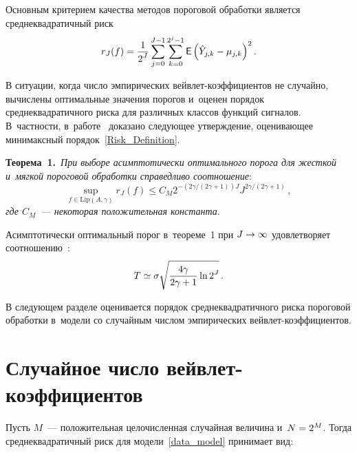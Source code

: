 \begin{multicols}{2}
Основным критерием качества методов пороговой обработки является 
среднеквадратичный риск
\begin{equation}\label{Risk_Definition}
r_J(f)=\displaystyle\frac{\displaystyle 1\mathstrut}{\displaystyle 2^J\mathstrut}\sum\limits_{j=0}^{J-1}\sum_{k=0}^{2^j-1}\limits 
{\sf E}\left(\hat{Y}_{j,k}-\mu_{j,k}\right)^2.
\end{equation}

В ситуации, когда число эмпирических вейв\-лет-ко\-эф\-фи\-ци\-ен\-тов 
не случайно, вы\-чис\-ле\-ны оптимальные значения порогов и~оценен порядок 
сред\-не\-квад\-ра\-тич\-но\-го рис\-ка для различных классов функций сигналов. 
В~част\-ности, в~работе~\cite{DJ95} доказано сле\-ду\-ющее утверж\-де\-ние, 
оценивающее минимаксный 
порядок~\eqref{Risk_Definition}.

\smallskip

\noindent
\textbf{Теорема~1.}\ \textit{При выборе асимптотически оптимального 
порога для жест\-кой и~мяг\-кой пороговой обработки справедливо соотношение}:
$$
\sup\limits_{f\in \mathrm{Lip}\left(A,\gamma\right)}{r_J(f)}\leqslant 
C_M2^{-({2\gamma}/({2\gamma+1}))J}
J^{{2\gamma}/({2\gamma+1})}\,,
$$
\textit{где $C_M$~--- некоторая положительная константа}.

\smallskip

Асимптотически оптимальный порог в~тео\-ре\-ме~1 при $J\hm\to\infty$ удовлетворяет 
соотношению~\cite{Jan01}:
$$
T\simeq\sigma\sqrt{\displaystyle\frac{\displaystyle 4\gamma\mathstrut}{\displaystyle 2\gamma+1\mathstrut}\ln2^J}\,.
$$


В следующем разделе оценивается порядок сред\-не\-квад\-ра\-тич\-но\-го риска 
пороговой обработки в~модели со случайным чис\-лом эмпирических вейв\-лет-ко\-эф\-фи\-ци\-ен\-тов.

\vspace*{-6pt}

\section{Случайное число вейвлет-коэффициентов}

Пусть $M$~--- положительная целочисленная случайная величина и~$N\hm=2^M$. 
Тогда сред\-не\-квад\-ра\-тич\-ный риск для 
модели~\eqref{data_model} принимает вид:


\end{multicols}
